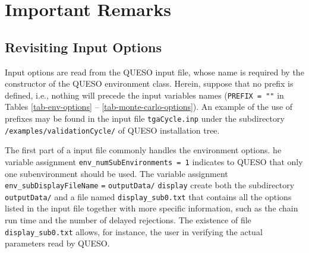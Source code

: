 \chapter{Important Remarks}


\section{Revisiting Input Options}\label{sec:revisiting_input}

Input options are read from the QUESO input file, whose name is required by the constructor of the QUESO environment class. Herein, suppose that no prefix is defined, i.e., nothing will precede the input variables names (\verb+PREFIX = ""+ in Tables \ref{tab-env-options} -- \ref{tab-monte-carlo-options}). An example of the use of prefixes may be found in the input file \texttt{tgaCycle.inp} under the subdirectory  \texttt{/examples/validationCycle/} of QUESO installation tree.

The first part of a input file commonly handles the environment options. he variable assignment \verb+env_numSubEnvironments = 1+ indicates to QUESO that only one subenvironment should be used. The variable assignment \texttt{env\_subDisplayFileName} \texttt{=} \texttt{outputData/} \texttt{display} create both the subdirectory \verb+outputData/+ and a file named \verb+display_sub0.txt+ that contains all the options listed in the input file together with more specific information, such as the chain run time and the number of delayed rejections. The existence of file  \verb+display_sub0.txt+  allows, for instance, the user in verifying the actual parameters read by QUESO.


